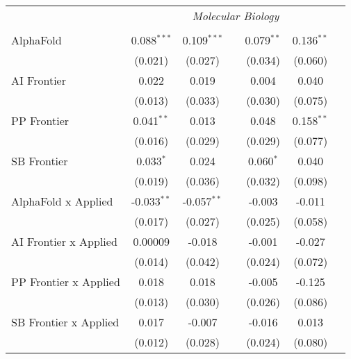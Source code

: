 \begin{tabular}{lcccccc}
 & \multicolumn{6}{c}{\textit{Molecular Biology}} \\ \\
   AlphaFold                      & 0.088$^{***}$ & 0.109$^{***}$ &               & 0.079$^{**}$ & 0.136$^{**}$ &   \\   
                                  & (0.021)       & (0.027)       &               & (0.034)      & (0.060)      &   \\   
   AI Frontier                    & 0.022         & 0.019         &               & 0.004        & 0.040        &   \\   
                                  & (0.013)       & (0.033)       &               & (0.030)      & (0.075)      &   \\   
   PP Frontier                    & 0.041$^{**}$  & 0.013         &               & 0.048        & 0.158$^{**}$ &   \\   
                                  & (0.016)       & (0.029)       &               & (0.029)      & (0.077)      &   \\   
   SB Frontier                    & 0.033$^{*}$   & 0.024         &               & 0.060$^{*}$  & 0.040        &   \\   
                                  & (0.019)       & (0.036)       &               & (0.032)      & (0.098)      &   \\   
   AlphaFold x Applied            & -0.033$^{**}$ & -0.057$^{**}$ &               & -0.003       & -0.011       &   \\   
                                  & (0.017)       & (0.027)       &               & (0.025)      & (0.058)      &   \\   
   AI Frontier x Applied          & 0.00009       & -0.018        &               & -0.001       & -0.027       &   \\   
                                  & (0.014)       & (0.042)       &               & (0.024)      & (0.072)      &   \\   
   PP Frontier x Applied          & 0.018         & 0.018         &               & -0.005       & -0.125       &   \\   
                                  & (0.013)       & (0.030)       &               & (0.026)      & (0.086)      &   \\   
   SB Frontier x Applied          & 0.017         & -0.007        &               & -0.016       & 0.013        &   \\   
                                  & (0.012)       & (0.028)       &               & (0.024)      & (0.080)      &   \\   

\end{tabular}
